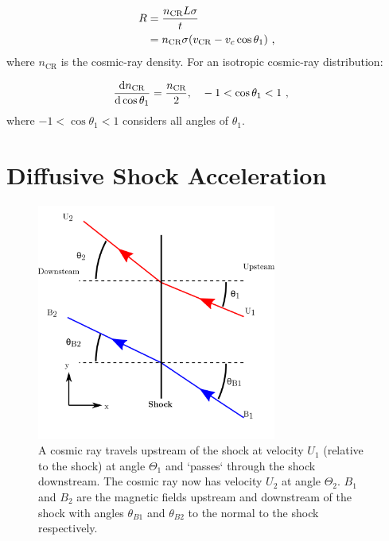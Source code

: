 \begin{equation}
    \begin{aligned}
        R&=\frac{n_\text{CR}L\sigma}{t} \\
        &=n_\text{CR}\sigma\qty(v_\text{CR}-v_c\cos\theta_1) \text { ,}
    \end{aligned}
\end{equation}
\noindent where $n_\text{CR}$ is the cosmic-ray density. For an isotropic cosmic-ray distribution:

\begin{equation}
    \begin{aligned}
        \dv{n_\text{CR}}{\cos\theta_1}&=\frac{n_\text{CR}}{2}\text{,}\quad -1<\cos\theta_1<1\text{ ,}
    \end{aligned}
\end{equation}
\noindent where $-1<\cos\theta_1<1$ considers all angles of $\theta_1$.

\section{Diffusive Shock Acceleration}

\begin{figure}
	\centering
	\includegraphics[width=0.7\textwidth]{A3_Diffusive_Shock_Acceleration/Images/shock_dynamics.png}
	\caption{A cosmic ray travels upstream of the shock at velocity $U_1$ (relative to the shock) at angle $\Theta_1$ and `passes` through the shock downstream. The cosmic ray now has velocity $U_2$ at angle $\Theta_2$. $B_1$ and $B_2$ are the magnetic fields upstream and downstream of the shock with angles $\theta_{B1}$ and $\theta_{B2}$ to the normal to the shock respectively.}
	\label{fig:A3_shock_dynamics}
\end{figure}

